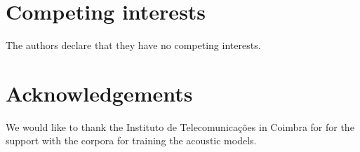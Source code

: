 \documentclass[twocolumn]{bmcart}%
\begin{document}

\begin{backmatter}

\section*{Competing interests}
  The authors declare that they have no competing interests.

\section*{Acknowledgements}
  We would like to thank the Instituto de Telecomunica\c{c}\~oes in Coimbra for
  for the support with the corpora for training the acoustic models.





\end{backmatter}
\end{document}
